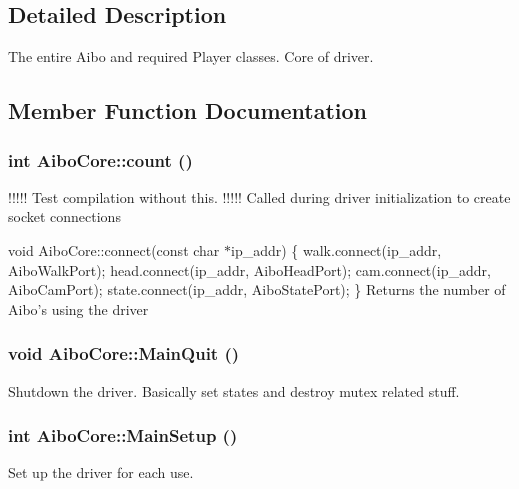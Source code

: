 \subsection{Detailed Description}
The entire Aibo and required Player classes. Core of driver. 

\subsection{Member Function Documentation}
\hypertarget{classAiboCore_a7cf6b6a288291b36254dc29ae089d6bc}{
\subsubsection[{count}]{\setlength{\rightskip}{0pt plus 5cm}int AiboCore::count ()}}
\label{classAiboCore_a7cf6b6a288291b36254dc29ae089d6bc}
!!!!! Test compilation without this. !!!!! Called during driver initialization to create socket connections

void AiboCore::connect(const char $\ast$ip\_\-addr) \{ walk.connect(ip\_\-addr, AiboWalkPort); head.connect(ip\_\-addr, AiboHeadPort); cam.connect(ip\_\-addr, AiboCamPort); state.connect(ip\_\-addr, AiboStatePort); \} Returns the number of Aibo's using the driver \hypertarget{classAiboCore_a4a06b4d7957998e00ffa662ff9345662}{
\subsubsection[{MainQuit}]{\setlength{\rightskip}{0pt plus 5cm}void AiboCore::MainQuit ()}}
\label{classAiboCore_a4a06b4d7957998e00ffa662ff9345662}
Shutdown the driver. Basically set states and destroy mutex related stuff. \hypertarget{classAiboCore_a940aa3f41c521cfc8e1ea69b8a616648}{
\subsubsection[{MainSetup}]{\setlength{\rightskip}{0pt plus 5cm}int AiboCore::MainSetup ()}}
\label{classAiboCore_a940aa3f41c521cfc8e1ea69b8a616648}
Set up the driver for each use. 

